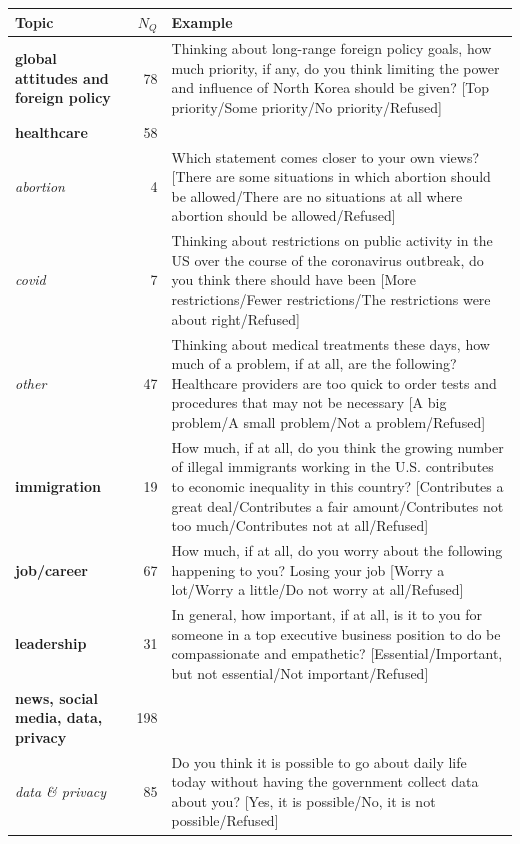 \begin{table}[!h]
\begin{center}
\begin{small}
        \begin{tabular}{lrp{10cm}}
            \toprule
            Topic &  $N_Q$ & Example \\
            \midrule
            \textbf{global attitudes and foreign policy} &    78 & Thinking about long-range foreign policy goals, how much priority, if any, do you think limiting the power and influence of North Korea should be given? [Top priority/Some priority/No priority/Refused]\\
            \textbf{healthcare} &    58 &  \\ 
            \textit{abortion} &    4 & Which statement comes closer to your own views? [There are some situations in which abortion should be allowed/There are no situations at all where abortion should be allowed/Refused] \\ 
            \textit{covid} &    7 & Thinking about restrictions on public activity in the US over the course of the coronavirus outbreak, do you think there should have been [More restrictions/Fewer restrictions/The restrictions were about right/Refused] \\ 
            \textit{other} &    47 & Thinking about medical treatments these days, how much of a problem, if at all, are the following? Healthcare providers are too quick to order tests and procedures that may not be necessary [A big problem/A small problem/Not a problem/Refused] \\ \hline
            \textbf{immigration} &    19 & How much, if at all, do you think the growing number of illegal immigrants working in the U.S. contributes to economic inequality in this country? [Contributes a great deal/Contributes a fair amount/Contributes not too much/Contributes not at all/Refused] \\ \hline
            \textbf{job/career} &    67 & How much, if at all, do you worry about the following happening to you? Losing your job [Worry a lot/Worry a little/Do not worry at all/Refused] \\ \hline
            \textbf{leadership} &    31 & In general, how important, if at all, is it to you for someone in a top executive business position to do be compassionate and empathetic? [Essential/Important, but not essential/Not important/Refused] \\ \hline
            \textbf{news, social media, data, privacy} &   198 & \\
            \textit{data \& privacy} &   85 & Do you think it is possible to go about daily life today without having the government collect data about you? [Yes, it is possible/No, it is not possible/Refused] \\

\end{tabular}
\end{small}
\end{center}
\end{table}
